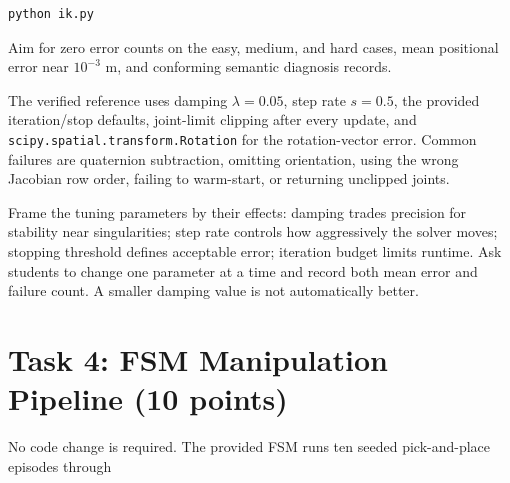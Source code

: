 \documentclass[11pt]{article}
\newcommand{\code}[1]{\nolinkurl{#1}}
\begin{document}
\begin{lstlisting}[language=bash]
python ik.py
\end{lstlisting}

Aim for zero error counts on the easy, medium, and hard cases, mean positional
error near $10^{-3}$ m, and conforming semantic diagnosis records.

\begin{tutornote}
The verified reference uses damping $\lambda=0.05$, step rate $s=0.5$, the
provided iteration/stop defaults, joint-limit clipping after every update, and
\code{scipy.spatial.transform.Rotation} for the rotation-vector error. Common
failures are quaternion subtraction, omitting orientation, using the wrong
Jacobian row order, failing to warm-start, or returning unclipped joints.

Frame the tuning parameters by their effects: damping trades precision for
stability near singularities; step rate controls how aggressively the solver
moves; stopping threshold defines acceptable error; iteration budget limits
runtime. Ask students to change one parameter at a time and record both mean
error and failure count. A smaller damping value is not automatically better.
\end{tutornote}

\section{Task 4: FSM Manipulation Pipeline (10 points)}

No code change is required. The provided FSM runs ten seeded pick-and-place
episodes through
\end{document}
